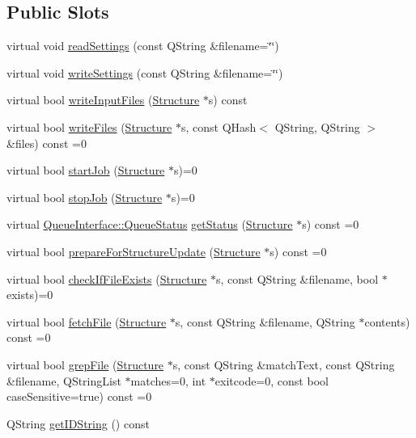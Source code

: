 \subsection*{Public Slots}
\begin{DoxyCompactItemize}
\item 
virtual void \hyperlink{classGlobalSearch_1_1QueueInterface_a6f52e6123a0963a759a18e01804360ac}{read\+Settings} (const Q\+String \&filename=\char`\"{}\char`\"{})
\item 
virtual void \hyperlink{classGlobalSearch_1_1QueueInterface_a2ca92e5132d02e5eda672d2904779a3c}{write\+Settings} (const Q\+String \&filename=\char`\"{}\char`\"{})
\item 
virtual bool \hyperlink{classGlobalSearch_1_1QueueInterface_a4f0c5df9f5945c9c5a64cdf47b7834fa}{write\+Input\+Files} (\hyperlink{classGlobalSearch_1_1Structure}{Structure} $\ast$s) const 
\item 
virtual bool \hyperlink{classGlobalSearch_1_1QueueInterface_a8850904265fa4f397aa37fce9b548829}{write\+Files} (\hyperlink{classGlobalSearch_1_1Structure}{Structure} $\ast$s, const Q\+Hash$<$ Q\+String, Q\+String $>$ \&files) const =0
\item 
virtual bool \hyperlink{classGlobalSearch_1_1QueueInterface_a70a6aa40639e36575a90ffd17c595f55}{start\+Job} (\hyperlink{classGlobalSearch_1_1Structure}{Structure} $\ast$s)=0
\item 
virtual bool \hyperlink{classGlobalSearch_1_1QueueInterface_ab61d5cc09730f42f225571f6865ed383}{stop\+Job} (\hyperlink{classGlobalSearch_1_1Structure}{Structure} $\ast$s)=0
\item 
virtual \hyperlink{classGlobalSearch_1_1QueueInterface_a08dcf06d1b99f6333472470490ca9a6d}{Queue\+Interface\+::\+Queue\+Status} \hyperlink{classGlobalSearch_1_1QueueInterface_a8294808ad1612f2b6fccd932a9d7fd35}{get\+Status} (\hyperlink{classGlobalSearch_1_1Structure}{Structure} $\ast$s) const =0
\item 
virtual bool \hyperlink{classGlobalSearch_1_1QueueInterface_ac3a92214ace255b679951f5a5ef9a11c}{prepare\+For\+Structure\+Update} (\hyperlink{classGlobalSearch_1_1Structure}{Structure} $\ast$s) const =0
\item 
virtual bool \hyperlink{classGlobalSearch_1_1QueueInterface_ab9ea013a587a597749be3efbe035eff8}{check\+If\+File\+Exists} (\hyperlink{classGlobalSearch_1_1Structure}{Structure} $\ast$s, const Q\+String \&filename, bool $\ast$exists)=0
\item 
virtual bool \hyperlink{classGlobalSearch_1_1QueueInterface_ac8af84b05ee61d8c9bb6f1648cc5f221}{fetch\+File} (\hyperlink{classGlobalSearch_1_1Structure}{Structure} $\ast$s, const Q\+String \&filename, Q\+String $\ast$contents) const =0
\item 
virtual bool \hyperlink{classGlobalSearch_1_1QueueInterface_ad3a350e2b2cd0ac746b3c3c22e8606a5}{grep\+File} (\hyperlink{classGlobalSearch_1_1Structure}{Structure} $\ast$s, const Q\+String \&match\+Text, const Q\+String \&filename, Q\+String\+List $\ast$matches=0, int $\ast$exitcode=0, const bool case\+Sensitive=true) const =0
\item 
Q\+String \hyperlink{classGlobalSearch_1_1QueueInterface_a105fbf7ab1565d55cae260269d4be627}{get\+I\+D\+String} () const 
\end{DoxyCompactItemize}
